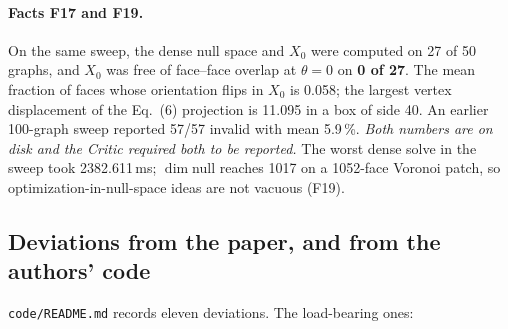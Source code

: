 \documentclass[10pt,a4paper]{article}
\newcommand{\fn}[1]{\nolinkurl{#1}}
\begin{document}
\paragraph{Facts F17 and F19.} On the same sweep, the dense null space and $X_0$ were computed
on 27 of 50 graphs, and $X_0$ was free of face--face overlap at $\theta=0$ on \textbf{0 of 27}.
The mean fraction of faces whose orientation flips in $X_0$ is 0.058; the largest vertex
displacement of the Eq.~(6) projection is 11.095 in a box of side 40. An earlier 100-graph
sweep reported 57/57 invalid with mean 5.9\,\%. \emph{Both numbers are on disk and the Critic
required both to be reported.} The worst dense solve in the sweep took 2382.611\,ms; $\dim$null
reaches 1017 on a 1052-face Voronoi patch, so optimization-in-null-space ideas are not vacuous
(F19).

\subsection{Deviations from the paper, and from the authors' code}

\fn{code/README.md} records eleven deviations. The load-bearing ones:
\end{document}
